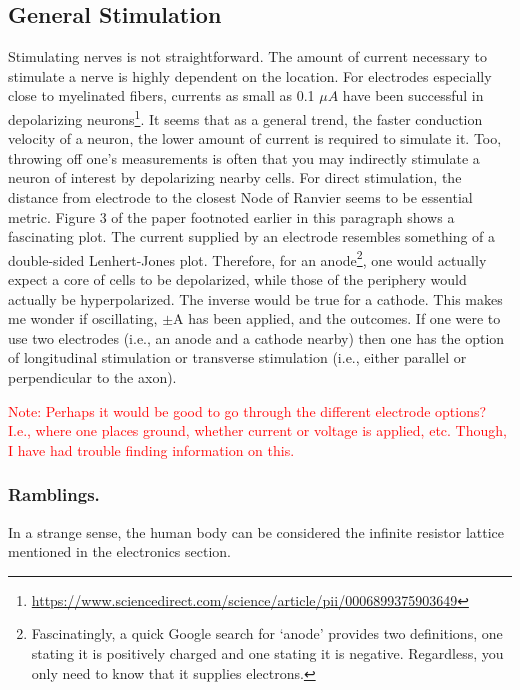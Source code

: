 \documentclass[12pt]{report}
\begin{document}
\subsection{General Stimulation}
Stimulating nerves is not straightforward. The amount of current necessary to stimulate a nerve is highly dependent on the location. For electrodes especially close to myelinated fibers, currents as small as 0.1 $\mu A$ have been successful in depolarizing neurons\footnote{\url{https://www.sciencedirect.com/science/article/pii/0006899375903649}}. It seems that as a general trend, the faster conduction velocity of a neuron, the lower amount of current is required to simulate it. Too, throwing off one's measurements is often that you may indirectly stimulate a neuron of interest by depolarizing nearby cells. For direct stimulation, the distance from electrode to the closest Node of Ranvier seems to be essential metric. Figure 3 of the paper footnoted earlier in this paragraph shows a fascinating plot. The current supplied by an electrode resembles something of a double-sided Lenhert-Jones plot. Therefore, for an anode\footnote{Fascinatingly, a quick Google search for `anode' provides two definitions, one stating it is positively charged and one stating it is negative. Regardless, you only need to know that it supplies electrons.}, one would actually expect a core of cells to be depolarized, while those of the periphery would actually be hyperpolarized. The inverse would be true for a cathode. This makes me wonder if oscillating, $\pm$A has been applied, and the outcomes. If one were to use two electrodes (i.e., an anode and a cathode nearby) then one has the option of longitudinal stimulation or transverse stimulation (i.e., either parallel or perpendicular to the axon).\newline

\textcolor{red}{Note: Perhaps it would be good to go through the different electrode options? I.e., where one places ground, whether current or voltage is applied, etc. Though, I have had trouble finding information on this.}

\subsubsection{Ramblings.}
In a strange sense, the human body can be considered the infinite resistor lattice mentioned in the electronics section. 
\end{document}
